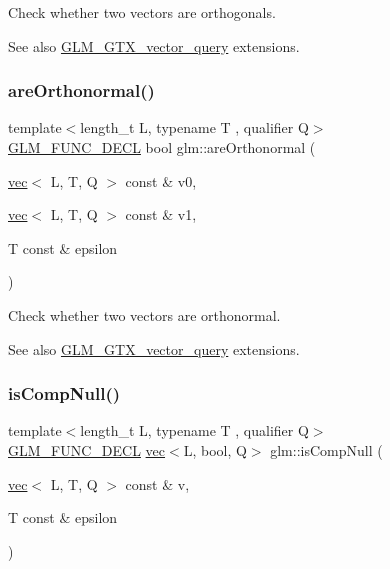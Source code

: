 Check whether two vectors are orthogonals. \begin{DoxySeeAlso}{See also}
\mbox{\hyperlink{group__gtx__vector__query}{G\+L\+M\+\_\+\+G\+T\+X\+\_\+vector\+\_\+query}} extensions. 
\end{DoxySeeAlso}
\mbox{\label{group__gtx__vector__query_ga1b091c3d7f9ee3b0708311c001c293e3}} 
\subsubsection{\texorpdfstring{are\+Orthonormal()}{areOrthonormal()}}
{\footnotesize\ttfamily template$<$length\+\_\+t L, typename T , qualifier Q$>$ \\
\mbox{\hyperlink{setup_8hpp_ab2d052de21a70539923e9bcbf6e83a51}{G\+L\+M\+\_\+\+F\+U\+N\+C\+\_\+\+D\+E\+CL}} bool glm\+::are\+Orthonormal (\begin{DoxyParamCaption}\item[{\mbox{\hyperlink{structglm_1_1vec}{vec}}$<$ L, T, Q $>$ const \&}]{v0,  }\item[{\mbox{\hyperlink{structglm_1_1vec}{vec}}$<$ L, T, Q $>$ const \&}]{v1,  }\item[{T const \&}]{epsilon }\end{DoxyParamCaption})}

Check whether two vectors are orthonormal. \begin{DoxySeeAlso}{See also}
\mbox{\hyperlink{group__gtx__vector__query}{G\+L\+M\+\_\+\+G\+T\+X\+\_\+vector\+\_\+query}} extensions. 
\end{DoxySeeAlso}
\mbox{\label{group__gtx__vector__query_gaf6ec1688eab7442fe96fe4941d5d4e76}} 
\subsubsection{\texorpdfstring{is\+Comp\+Null()}{isCompNull()}}
{\footnotesize\ttfamily template$<$length\+\_\+t L, typename T , qualifier Q$>$ \\
\mbox{\hyperlink{setup_8hpp_ab2d052de21a70539923e9bcbf6e83a51}{G\+L\+M\+\_\+\+F\+U\+N\+C\+\_\+\+D\+E\+CL}} \mbox{\hyperlink{structglm_1_1vec}{vec}}$<$L, bool, Q$>$ glm\+::is\+Comp\+Null (\begin{DoxyParamCaption}\item[{\mbox{\hyperlink{structglm_1_1vec}{vec}}$<$ L, T, Q $>$ const \&}]{v,  }\item[{T const \&}]{epsilon }\end{DoxyParamCaption})}


